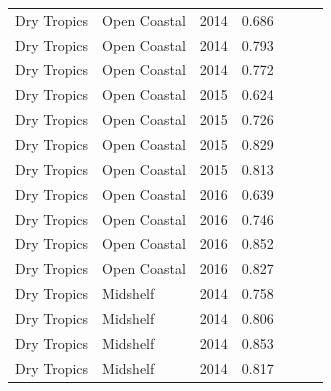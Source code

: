 \begin{longtable}{llccccc}
  Dry Tropics & Open Coastal & 2014 & 0.686 & \cellcolor[HTML]{B0D235}{B} & \cellcolor[HTML]{B0D235}{B} & \cellcolor[HTML]{B0D235}{B} \\ 
  Dry Tropics & Open Coastal & 2014 & 0.793 & \cellcolor[HTML]{B0D235}{B} & \cellcolor[HTML]{B0D235}{B} & \cellcolor[HTML]{B0D235}{B} \\ 
  Dry Tropics & Open Coastal & 2014 & 0.772 & \cellcolor[HTML]{B0D235}{B} & \cellcolor[HTML]{B0D235}{B} & \cellcolor[HTML]{B0D235}{B} \\ 
  Dry Tropics & Open Coastal & 2015 & 0.624 & \cellcolor[HTML]{F0C918}{C} & \cellcolor[HTML]{B0D235}{B} & \cellcolor[HTML]{F0C918}{C} \\ 
  Dry Tropics & Open Coastal & 2015 & 0.726 & \cellcolor[HTML]{B0D235}{B} & \cellcolor[HTML]{B0D235}{B} & \cellcolor[HTML]{B0D235}{B} \\ 
  Dry Tropics & Open Coastal & 2015 & 0.829 & \cellcolor[HTML]{B0D235}{B} & \cellcolor[HTML]{00734D}{A} & \cellcolor[HTML]{B0D235}{B} \\ 
  Dry Tropics & Open Coastal & 2015 & 0.813 & \cellcolor[HTML]{B0D235}{B} & \cellcolor[HTML]{00734D}{A} & \cellcolor[HTML]{B0D235}{B} \\ 
  Dry Tropics & Open Coastal & 2016 & 0.639 & \cellcolor[HTML]{F0C918}{C} & \cellcolor[HTML]{B0D235}{B} & \cellcolor[HTML]{F0C918}{C} \\ 
  Dry Tropics & Open Coastal & 2016 & 0.746 & \cellcolor[HTML]{B0D235}{B} & \cellcolor[HTML]{B0D235}{B} & \cellcolor[HTML]{B0D235}{B} \\ 
  Dry Tropics & Open Coastal & 2016 & 0.852 & \cellcolor[HTML]{00734D}{A} & \cellcolor[HTML]{00734D}{A} & \cellcolor[HTML]{00734D}{A} \\ 
  Dry Tropics & Open Coastal & 2016 & 0.827 & \cellcolor[HTML]{B0D235}{B} & \cellcolor[HTML]{00734D}{A} & \cellcolor[HTML]{B0D235}{B} \\ 
  Dry Tropics & Midshelf & 2014 & 0.758 & \cellcolor[HTML]{B0D235}{B} & \cellcolor[HTML]{B0D235}{B} & \cellcolor[HTML]{B0D235}{B} \\ 
  Dry Tropics & Midshelf & 2014 & 0.806 & \cellcolor[HTML]{B0D235}{B} & \cellcolor[HTML]{00734D}{A} & \cellcolor[HTML]{B0D235}{B} \\ 
  Dry Tropics & Midshelf & 2014 & 0.853 & \cellcolor[HTML]{00734D}{A} & \cellcolor[HTML]{00734D}{A} & \cellcolor[HTML]{00734D}{A} \\ 
  Dry Tropics & Midshelf & 2014 & 0.817 & \cellcolor[HTML]{B0D235}{B} & \cellcolor[HTML]{00734D}{A} & \cellcolor[HTML]{B0D235}{B} \\ 

\end{longtable}
